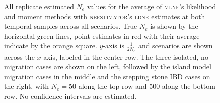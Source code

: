 \begin{landscape}
\begin{figure}[ht]
\centering
{}
\caption[All replicate estimated $N_e$ values for the average of \textsc{mlne}'s likelihood and moment methods with \textsc{neestimator}'s \textsc{ldne} estimates at both temporal samples across all scenarios.]{All replicate estimated $N_e$ values for the average of \textsc{mlne}'s likelihood and moment methods with \textsc{neestimator}'s \textsc{ldne} estimates at both temporal samples across all scenarios. True $N_e$ is shown by the horizontal green lines, point estimates in red with their average indicate by the orange square. $y$-axis is $\frac{1}{2 N_e}$ and scenarios are shown across the $x$-axis, labeled in the center row. The three isolated, no migration cases are shown on the left, followed by the island model migration cases in the middle and the stepping stone IBD cases on the right, with $N_e = 50$ along the top row and 500 along the bottom row. No confidence intervals are estimated.}
\label{fig:supp_avg3}
\end{figure}



\end{landscape}
